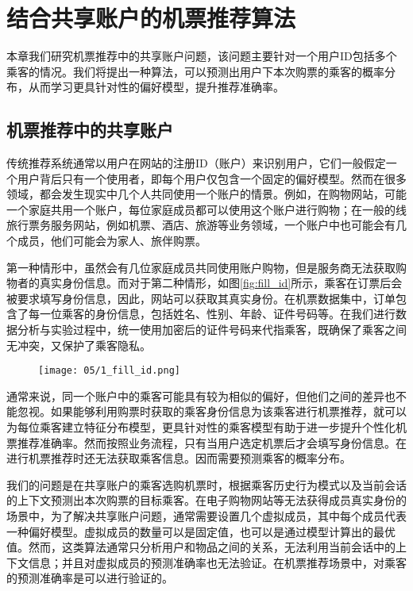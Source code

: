 
\chapter{结合共享账户的机票推荐算法}
\label{chap:share}

本章我们研究机票推荐中的共享账户问题，该问题主要针对一个用户ID包括多个乘客的情况。我们将提出一种算法，可以预测出用户下本次购票的乘客的概率分布，从而学习更具针对性的偏好模型，提升推荐准确率。

\section{机票推荐中的共享账户}

传统推荐系统通常以用户在网站的注册ID（账户）来识别用户，它们一般假定一个用户背后只有一个使用者，即每个用户仅包含一个固定的偏好模型。然而在很多领域，都会发生现实中几个人共同使用一个账户的情景。例如，在购物网站，可能一个家庭共用一个账户，每位家庭成员都可以使用这个账户进行购物；在一般的线旅行票务服务网站，例如机票、酒店、旅游等业务领域，一个账户中也可能会有几个成员，他们可能会为家人、旅伴购票。

第一种情形中，虽然会有几位家庭成员共同使用账户购物，但是服务商无法获取购物者的真实身份信息。而对于第二种情形，如图\ref{fig:fill_id}所示，乘客在订票后会被要求填写身份信息，因此，网站可以获取其真实身份。在机票数据集中，订单包含了每一位乘客的身份信息，包括姓名、性别、年龄、证件号码等。在我们进行数据分析与实验过程中，统一使用加密后的证件号码来代指乘客，既确保了乘客之间无冲突，又保护了乘客隐私。

\begin{figure}
 \centering
 \texttt{[image: 05/1\_fill\_id.png]}
\end{figure}

通常来说，同一个账户中的乘客可能具有较为相似的偏好，但他们之间的差异也不能忽视。如果能够利用购票时获取的乘客身份信息为该乘客进行机票推荐，就可以为每位乘客建立特征分布模型，更具针对性的乘客模型有助于进一步提升个性化机票推荐准确率。然而按照业务流程，只有当用户选定机票后才会填写身份信息。在进行机票推荐时还无法获取乘客信息。因而需要预测乘客的概率分布。

我们的问题是在共享账户的乘客选购机票时，根据乘客历史行为模式以及当前会话的上下文预测出本次购票的目标乘客。在电子购物网站等无法获得成员真实身份的场景中，为了解决共享账户问题，通常需要设置几个虚拟成员，其中每个成员代表一种偏好模型。虚拟成员的数量可以是固定值，也可以是通过模型计算出的最优值。然而，这类算法通常只分析用户和物品之间的关系，无法利用当前会话中的上下文信息；并且对虚拟成员的预测准确率也无法验证。在机票推荐场景中，对乘客的预测准确率是可以进行验证的。

